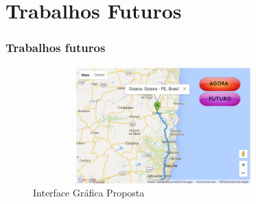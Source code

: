 \documentclass[11pt]{beamer}
\begin{document}
\section{ Trabalhos Futuros}
\begin{frame}\frametitle{Trabalhos futuros}
\transboxout[duration=2, direction=25]
	\begin{figure}[ht]
		\centering
		\caption{ Interface Gráfica Proposta}
		\includegraphics[width=100mm, height=45mm]{Figuras/BigData/InterfaceGrafica.png}
	\end{figure}
	
\end{frame}
\end{document}
